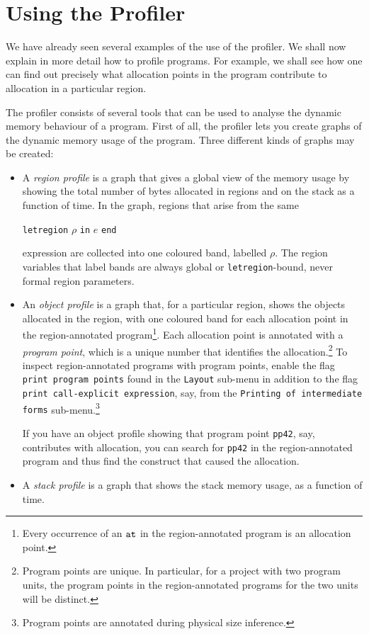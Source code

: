 \documentclass[12pt]{book}
\begin{document}
\chapter{Using the Profiler}
%
\label{useOfProf.sec}
We have already seen several examples of the use of the profiler. We
shall now explain in more detail how to profile programs. For example, we shall see
how one can find out precisely what allocation points in the program
contribute to allocation in a particular region.

The profiler consists of several tools that can be used to analyse the
dynamic memory behaviour of a program. First of all, the profiler lets
you create graphs of the dynamic memory usage of the program. Three
different kinds of graphs may be created:
\begin{itemize}
\item A 
  {\em region profile\/} is a graph that gives a global view of the
  memory usage by showing the total number of bytes allocated in
  regions and on the stack as a function of time. In the graph,
  regions that arise from the same
  \begin{center}
    \texttt{letregion} $\rho$ \texttt{in} $e$ \texttt{end}
  \end{center}
  expression are collected into one coloured band, labelled $\rho$. The
  region variables that label bands are always global or {\tt letregion}-bound,
  never formal region parameters.
\item An 
  {\em object profile\/} is a graph that, for a particular region,
  shows the objects allocated in the region, with one coloured band
  for each allocation point in the region-annotated
  program\footnote{Every occurrence of an $\mathbin{\hbox{\tt at}}$ in the
    region-annotated program is an allocation point.}. Each allocation
  point is annotated with a
  {\em program point}, which is a unique number that identifies the
  allocation.\footnote{Program points are unique. In particular, for a
    project with two program units, the program points in the
    region-annotated programs for the two units will be distinct.}  To
  inspect region-annotated programs with program points, enable the
  flag {\tt print program points} found in the {\tt Layout} sub-menu
  in addition to the flag {\tt print call-explicit expression}, say,
  from the {\tt Printing of intermediate forms}
  sub-menu.\footnote{Program points are annotated during physical size
    inference.}
  
  If you have an object profile showing that program point
  \texttt{pp42}, say, contributes with allocation, you can search for
  \texttt{pp42} in the region-annotated program and thus find the
  construct that caused the allocation.
\item A 
  {\em stack profile\/} is a graph that shows the stack memory usage,
  as a function of time.
\end{itemize}
  
\end{document}
